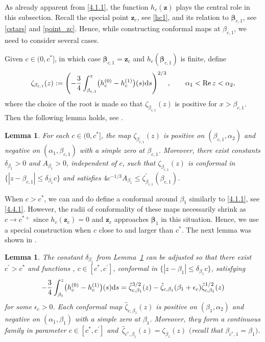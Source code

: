 \documentclass[10pt,a4paper]{amsart}
\numberwithin{equation}{section}
\newtheorem{Lemma}[Theorem]{Lemma}
\newcommand{\re}{\operatorname{Re} }
\newcommand{\z}	{{\boldsymbol z}}
\begin{document}
As already apparent from \eqref{4.1.1}, the function $ h_c(\z) $ plays the central role in this subsection. Recall the special point $ \z_c $, see \eqref{hc1}, and its relation to $ \boldsymbol\beta_{c,1} $, see \eqref{cstars} and \eqref{point_zc}. Hence, while constructing conformal maps at $ \beta_{c,1} $, we need to consider several cases.

Given $ c\in (0,c^*] $, in which case $ \boldsymbol\beta_{c,1}=\z_c $ and $ h_c(\boldsymbol\beta_{c,1})$ is finite, define
\begin{equation}
\label{4.2.1}
\zeta_{\beta_{c,1}}(z) := \left(-\frac34\int_{\beta_{c,1}}^z\bigl(h_c^{(0)}-h_c^{(1)}\bigr)(s) {\rm d}s\right)^{2/3}, \qquad \alpha_1<\re z<\alpha_2,
\end{equation}
where the choice of the root is made so that $ \zeta_{\beta_{c,1}}(z) $ is positive for $ x>\beta_{c,1} $. Then the following lemma holds, see \cite[Lemma~7.5]{ApDenYa21}.

\begin{Lemma}
\label{lem:4.2}
For each $ c\in(0,c^*] $, the map $ \zeta_{\beta_{c,1}}(z) $ is positive on $ (\beta_{c,1},\alpha_2) $ and negative on $ (\alpha_1,\beta_{c,1}) $ with a simple zero at $ \beta_{c,1} $. Moreover, there exist constants $ \delta_{\beta_1}>0 $ and $ A_{\beta_1}>0 $, independent of $ c $, such that $ \zeta_{\beta_{c,1}}(z) $ is conformal in $ \{|z-\beta_{c,1}| \leq \delta_{\beta_1}c \} $ and satisfies $ 4c^{-1/3} A_{\beta_1} \leq \zeta_{\beta_{c,1}}^\prime(\beta_{c,1}) $.
\end{Lemma}

When $ c>c^* $, we can and do define a conformal around $ \beta_1 $ similarly to \eqref{4.1.1}, see \eqref{4.4.1}. However, the radii of conformality of these maps necessarily shrink as $ c\to c^{*+} $ since $ h_c(\z_c)=0 $ and $ \z_c $ approaches $ \boldsymbol \beta_1 $ in this situation. Hence, we use a special construction when $ c $ close to and larger than $ c^* $. The next lemma was shown in \cite[Lemma~7.6]{ApDenYa21}.

\begin{Lemma}
\label{lem:4.3}
The constant $ \delta_{\beta_1} $ from Lemma~{\rm\ref{lem:4.2}} can be adjusted so that there exist $ c^\prime>c^* $ and functions , $ c\in[c^*,c^\prime] $, conformal in $ \{|z-\beta_1| \leq \delta_{\beta_1}c\} $, satisfying
\begin{equation}
\label{4.3.4}
-\frac34\int_{\beta_1}^z\bigl(h_c^{(0)}-h_c^{(1)}\bigr)(s) {\rm d}s = \hat\zeta_{c,\beta_1}^{3/2}(z) - \hat\zeta_{c,\beta_1}(\beta_1+\epsilon_c)\hat\zeta_{c,\beta_1}^{1/2}(z)
\end{equation}
for some $ \epsilon_c>0 $. Each conformal map $ \hat\zeta_{c,\beta_1}(z) $ is positive on $ (\beta_1,\alpha_2) $ and negative on $ (\alpha_1,\beta_1) $ with a simple zero at $ \beta_1 $. Moreover, they form a continuous family in parameter $ c\in[c^*,c^\prime] $ and~$ \hat\zeta_{c^*,\beta_1}(z) = \zeta_{\beta_1}(z) $ $($recall that $ \beta_{c^*,1}=\beta_1)$.
\end{Lemma}
\end{document}
